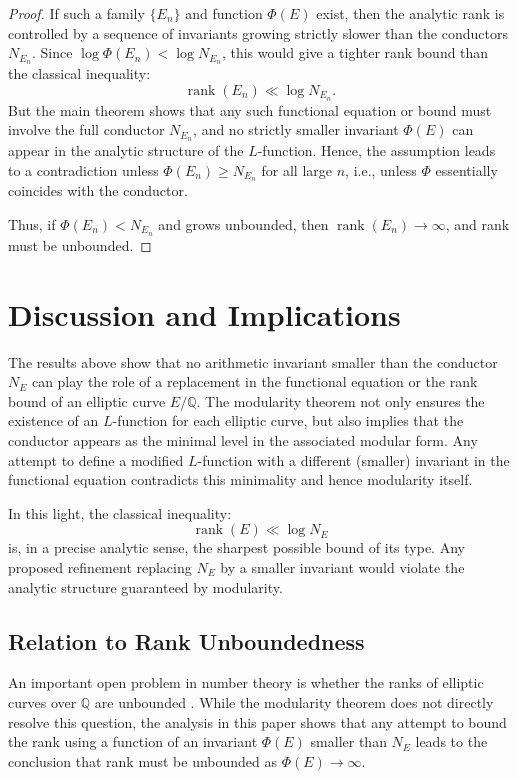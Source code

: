 \documentclass[a4paper,11pt]{article}
\theoremstyle{thmstyleone}%
\theoremstyle{thmstyletwo}%
\theoremstyle{thmstylethree}%
\begin{document}
	\begin{proof}
		If such a family \( \{E_n\} \) and function \( \Phi(E) \) exist, then the analytic rank is controlled by a sequence of invariants growing strictly slower than the conductors \( N_{E_n} \). Since \( \log \Phi(E_n) < \log N_{E_n} \), this would give a tighter rank bound than the classical inequality:
		\[
		\operatorname{rank}(E_n) \ll \log N_{E_n}.
		\]
		But the main theorem shows that any such functional equation or bound must involve the full conductor \( N_{E_n} \), and no strictly smaller invariant \( \Phi(E) \) can appear in the analytic structure of the \( L \)-function. Hence, the assumption leads to a contradiction unless \( \Phi(E_n) \ge N_{E_n} \) for all large \( n \), i.e., unless \( \Phi \) essentially coincides with the conductor.
		
		Thus, if \( \Phi(E_n) < N_{E_n} \) and grows unbounded, then \( \operatorname{rank}(E_n) \to \infty \), and rank must be unbounded.
	\end{proof}
	
	\section{Discussion and Implications}
	
	The results above show that no arithmetic invariant smaller than the conductor \( N_E \) can play the role of a replacement in the functional equation or the rank bound of an elliptic curve \( E/\mathbb{Q} \). The modularity theorem not only ensures the existence of an \( L \)-function for each elliptic curve, but also implies that the conductor appears as the minimal level in the associated modular form. Any attempt to define a modified \( L \)-function with a different (smaller) invariant in the functional equation contradicts this minimality and hence modularity itself.
	
	In this light, the classical inequality:
	\[
	\operatorname{rank}(E) \ll \log N_E
	\]
	is, in a precise analytic sense, the sharpest possible bound of its type. Any proposed refinement replacing \( N_E \) by a smaller invariant would violate the analytic structure guaranteed by modularity.
	
	\subsection*{Relation to Rank Unboundedness}
	
	An important open problem in number theory is whether the ranks of elliptic curves over \( \mathbb{Q} \) are unbounded \cite{silverman-rank-survey,bhargava-shankar,poonen-rains}. While the modularity theorem does not directly resolve this question, the analysis in this paper shows that any attempt to bound the rank using a function of an invariant \( \Phi(E) \) smaller than \( N_E \) leads to the conclusion that rank must be unbounded as \( \Phi(E) \to \infty \).
	
\end{document}
